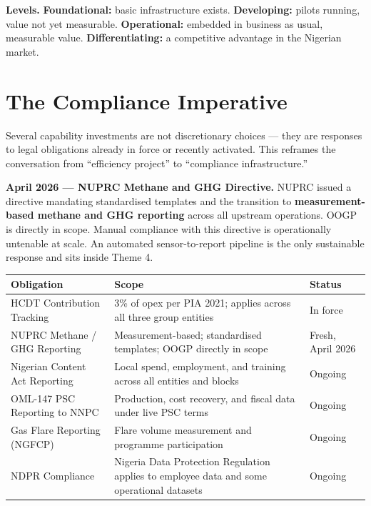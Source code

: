 \documentclass[10pt]{article}
\newcommand{\spacer}{\vspace{10pt}}
\newcommand{\bigspacer}{\vspace{16pt}}
\begin{document}
\spacer
{\small
\textbf{Levels.}\quad
\textbf{Foundational:} basic infrastructure exists. \quad
\textbf{Developing:} pilots running, value not yet measurable. \quad
\textbf{Operational:} embedded in business as usual, measurable value. \quad
\textbf{Differentiating:} a competitive advantage in the Nigerian market.
}

\bigspacer

\section{The Compliance Imperative}

Several capability investments are not discretionary choices --- they are
responses to legal obligations already in force or recently activated. This
reframes the conversation from ``efficiency project'' to ``compliance
infrastructure.''

\spacer

\noindent\colorbox{primary!8}{%
\begin{minipage}{\dimexpr\textwidth-2\fboxsep}
  \vspace{6pt}
  \textbf{\color{primary}April 2026 --- NUPRC Methane and GHG Directive.}\quad
  NUPRC issued a directive mandating standardised templates and the transition
  to \textbf{measurement-based methane and GHG reporting} across all upstream
  operations. OOGP is directly in scope. Manual compliance with this directive
  is operationally untenable at scale. An automated sensor-to-report pipeline
  is the only sustainable response and sits inside Theme 4.
  \vspace{6pt}
\end{minipage}}

\spacer
\small
\begin{tabularx}{\columnwidth}{@{}lXl@{}}
\toprule
\textbf{Obligation} & \textbf{Scope} & \textbf{Status} \\
\midrule
HCDT Contribution Tracking
  & 3\% of opex per PIA 2021; applies across all three group entities
  & In force \\
NUPRC Methane / GHG Reporting
  & Measurement-based; standardised templates; OOGP directly in scope
  & Fresh, April 2026 \\
Nigerian Content Act Reporting
  & Local spend, employment, and training across all entities and blocks
  & Ongoing \\
OML-147 PSC Reporting to NNPC
  & Production, cost recovery, and fiscal data under live PSC terms
  & Ongoing \\
Gas Flare Reporting (NGFCP)
  & Flare volume measurement and programme participation
  & Ongoing \\
NDPR Compliance
  & Nigeria Data Protection Regulation applies to employee data and
    some operational datasets
  & Ongoing \\
\bottomrule
\end{tabularx}
\normalsize
\end{document}
